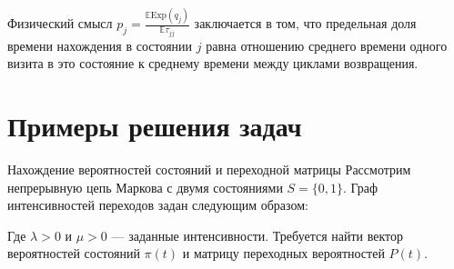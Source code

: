 \begin{note}
    Физический смысл $p_j = \frac{\mathbb{E} \text{Exp}(q_j)}{\mathbb{E} \tau_{jj}}$ заключается в том, что предельная доля времени нахождения в состоянии $j$ равна отношению среднего времени одного визита в это состояние к среднему времени между циклами возвращения.
\end{note}

\section{Примеры решения задач}

\begin{example}{Нахождение вероятностей состояний и переходной матрицы}
    Рассмотрим непрерывную цепь Маркова с двумя состояниями $S = \{0, 1\}$. Граф интенсивностей переходов задан следующим образом:
    \begin{center}
    \end{center}
    Где $\lambda > 0$ и $\mu > 0$ --- заданные интенсивности. Требуется найти вектор вероятностей состояний $\pi(t)$ и матрицу переходных вероятностей $P(t)$.
\end{example}

